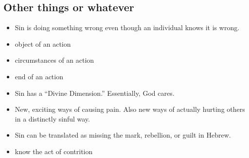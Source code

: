 \documentclass[11pt]{article}
\begin{document}
\subsection{Other things or whatever}
\begin{itemize}
	\item Sin is doing something wrong even though an individual
		knows it is wrong.
	\item object of an action
	\item circumstances of an action
	\item end of an action
	\item Sin has a ``Divine Dimension.''  Essentially, God cares.
	\item New, exciting ways of causing pain.  Also new ways of 
		actually hurting others in a distinctly %
		sinful way.
	\item Sin can be translated as missing the mark, rebellion, 
		or guilt in Hebrew.
	\item know the act of contrition
\end{itemize}
\end{document}
